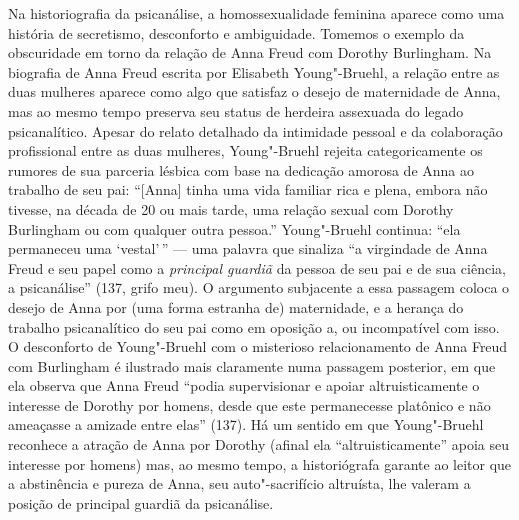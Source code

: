 Na historiografia da psicanálise, a homossexualidade feminina aparece
como uma história de secretismo, desconforto e ambiguidade. Tomemos o
exemplo da obscuridade em torno da relação de Anna Freud com Dorothy
Burlingham. Na biografia de Anna Freud escrita por Elisabeth
Young"-Bruehl, a relação entre as duas mulheres aparece como algo que
satisfaz o desejo de maternidade de Anna, mas ao mesmo tempo preserva
seu status de herdeira assexuada do legado psicanalítico. Apesar do
relato detalhado da intimidade pessoal e da colaboração profissional
entre as duas mulheres, Young"-Bruehl rejeita categoricamente os rumores
de sua parceria lésbica com base na dedicação amorosa de Anna ao
trabalho de seu pai: ``{[}Anna{]} tinha uma vida familiar rica e plena,
embora não tivesse, na década de 20 ou mais tarde, uma relação sexual
com Dorothy Burlingham ou com qualquer outra pessoa.'' Young"-Bruehl
continua: ``ela permaneceu uma `vestal'\,'' --- uma palavra que sinaliza
``a virgindade de Anna Freud e seu papel como a \emph{principal guardiã}
da pessoa de seu pai e de sua ciência, a psicanálise'' (137, grifo meu).
O argumento subjacente a essa passagem coloca o desejo de Anna por (uma
forma estranha de) maternidade, e a herança do trabalho psicanalítico do
seu pai como em oposição a, ou incompatível com isso. O desconforto de
Young"-Bruehl com o misterioso relacionamento de Anna Freud com
Burlingham é ilustrado mais claramente numa passagem posterior, em que
ela observa que Anna Freud ``podia supervisionar e apoiar
altruisticamente o interesse de Dorothy por homens, desde que este
permanecesse platônico e não ameaçasse a amizade entre elas'' (137). Há
um sentido em que Young"-Bruehl reconhece a atração de Anna por Dorothy
(afinal ela ``altruisticamente'' apoia seu interesse por homens) mas, ao
mesmo tempo, a historiógrafa garante ao leitor que a abstinência e
pureza de Anna, seu auto"-sacrifício altruísta, lhe valeram a posição de
principal guardiã da psicanálise.

